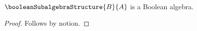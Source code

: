 

\begin{proposition}\label{notion_prefix_predicate_missing}
    $\booleanSubalgebraStructure{B}{A}$ is a Boolean algebra.
\end{proposition}
\begin{proof}
    Follows by notion.
\end{proof}
